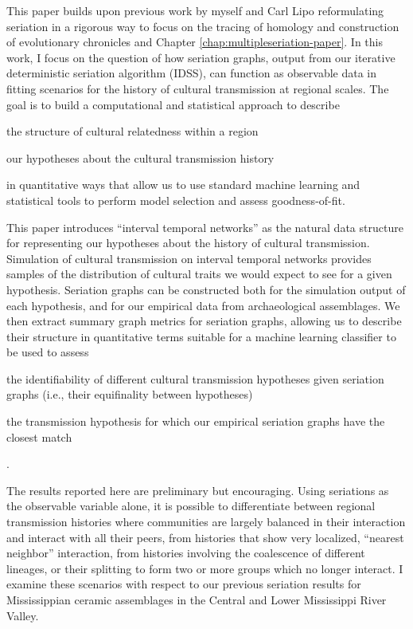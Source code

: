    This paper builds upon previous work by myself and Carl Lipo reformulating seriation in a rigorous way to focus on the tracing of homology and construction of evolutionary chronicles  \citep{Lipo1997,Lipo2001,Lipo2015,Madsen2008} and Chapter \ref{chap:multipleseriation-paper}. In this work, I focus on the question of how seriation graphs, output from our iterative deterministic seriation algorithm (IDSS), can function as observable data in fitting scenarios for the history of cultural transmission at regional scales.  The goal is to build a computational and statistical approach to describe \begin{dissparalist}
    \item the structure of cultural relatedness within a region  
    \item our hypotheses about the cultural transmission history 
    \end{dissparalist} in quantitative ways that allow us to use standard machine learning and statistical tools to perform model selection and assess goodness-of-fit.  
    
    This paper introduces ``interval temporal networks'' as the natural data structure for representing our hypotheses about the history of cultural transmission.  Simulation of cultural transmission on interval temporal networks provides samples of the distribution of cultural traits we would expect to see for a given hypothesis.  Seriation graphs can be constructed both for the simulation output of each hypothesis, and for our empirical data from archaeological assemblages.  We then extract summary graph metrics for seriation graphs, allowing us to describe their structure in quantitative terms suitable for a machine learning classifier to be used to assess \begin{dissparalist}
    \item the identifiability of different cultural transmission hypotheses given seriation graphs (i.e., their equifinality between hypotheses)
    \item the transmission hypothesis for which our empirical seriation graphs have the closest match
    \end{dissparalist}.
    
    The results reported here are preliminary but encouraging.  Using seriations as the observable variable alone, it is possible to differentiate between regional transmission histories where communities are largely balanced in their interaction and interact with all their peers, from histories that show very localized, ``nearest neighbor'' interaction, from histories involving the coalescence of different lineages, or their splitting to form two or more groups which no longer interact.  I examine these scenarios with respect to our previous seriation results for Mississippian ceramic assemblages in the Central and Lower Mississippi River Valley.   
    
